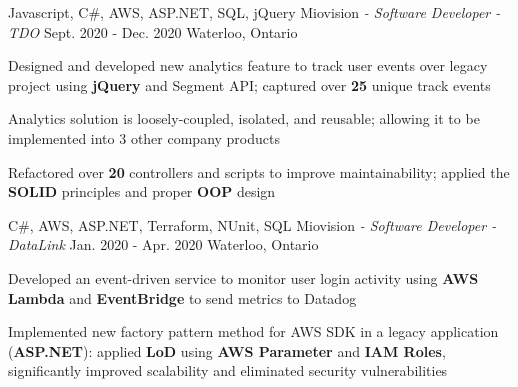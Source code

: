 \begin{siderules}
  \begin{cventries}
    \cventry
    {Javascript, C\#, AWS, ASP.NET, SQL, jQuery}
    {Miovision\hspace{0.15em} \bodyfontlight\itshape{- Software Developer - TDO}}
    {Sept. 2020 - Dec. 2020}
    {Waterloo, Ontario}
    {
      \begin{cvitems}
        \item {Designed and developed new analytics feature to track user events over legacy project using \textbf{jQuery} and Segment API; captured over \textbf{25} unique track events}
        \item {Analytics solution is loosely-coupled, isolated, and reusable; allowing it to be implemented into 3 other company products}
        \item {Refactored over \textbf{20} controllers and scripts to improve maintainability; applied the \textbf{SOLID} principles and proper \textbf{OOP} design}
      \end{cvitems}
    }
    \cventry
    {C\#, AWS, ASP.NET, Terraform, NUnit, SQL}
    {Miovision\hspace{0.15em} \bodyfontlight\itshape{- Software Developer - DataLink}}
    {Jan. 2020 - Apr. 2020}
    {Waterloo, Ontario}
    {
      \begin{cvitems}
        \item {Developed an event-driven service to monitor user login activity using \textbf{AWS Lambda} and \textbf{EventBridge} to send metrics to Datadog}
        \item {Implemented new factory pattern method for AWS SDK in a legacy application (\textbf{ASP.NET}): applied \textbf{LoD} using \textbf{AWS Parameter} and \textbf{IAM Roles}, significantly improved scalability and eliminated security vulnerabilities}

\end{cvitems}}
\end{cventries}
\end{siderules}
